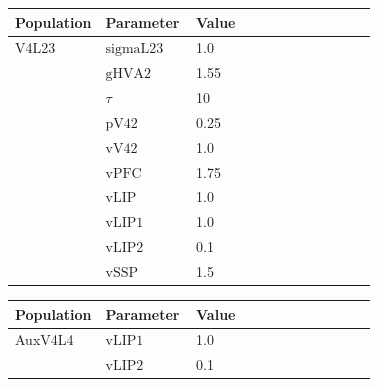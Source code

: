 \documentclass{article}
\begin{document}
\vspace{2ex}

\noindent
\begin{tabularx}{\linewidth}{|p{0.25\linewidth}|p{0.25\linewidth}|X|}\hline
\textbf{Population} & \textbf{Parameter} & \textbf{Value}   \\ \hline

    V4L23             & ${\text{sigmaL23}}$        & 1.0  \\ \hline

                 & ${\text{gHVA2}}$        & 1.55  \\ \hline

                 & $\tau$        & 10  \\ \hline

                 & ${\text{pV42}}$        & 0.25  \\ \hline

                 & ${\text{vV42}}$        & 1.0  \\ \hline

                 & ${\text{vPFC}}$        & 1.75  \\ \hline

                 & ${\text{vLIP}}$        & 1.0  \\ \hline

                 & ${\text{vLIP1}}$        & 1.0  \\ \hline

                 & ${\text{vLIP2}}$        & 0.1  \\ \hline

                 & ${\text{vSSP}}$        & 1.5  \\ \hline

\end{tabularx}

\vspace{2ex}

\noindent
\begin{tabularx}{\linewidth}{|p{0.25\linewidth}|p{0.25\linewidth}|X|}\hline
\textbf{Population} & \textbf{Parameter} & \textbf{Value}   \\ \hline

    AuxV4L4             & ${\text{vLIP1}}$        & 1.0  \\ \hline

                 & ${\text{vLIP2}}$        & 0.1  \\ \hline

\end{tabularx}
\end{document}
